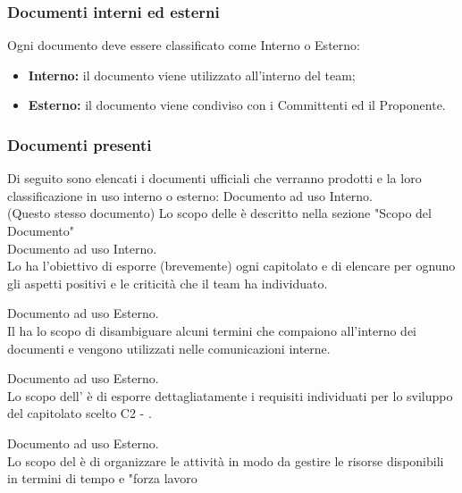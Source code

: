     \subsubsection{Documenti interni ed esterni}
      Ogni documento deve essere classificato come Interno o Esterno:
      \begin{itemize}
        \item \textbf{Interno:} il documento viene utilizzato all'interno del team;
        \item \textbf{Esterno:} il documento viene condiviso con i Committenti ed il Proponente.
      \end{itemize}

    \subsubsection{Documenti presenti}
      Di seguito sono elencati i documenti ufficiali che verranno prodotti e la loro classificazione in uso interno o esterno:
      \subsubsubsection{\NdP{}}
        Documento ad uso Interno.\\
        (Questo stesso documento) Lo scopo delle \textit{\NdP{}} è descritto nella sezione  "Scopo del Documento"\\

      \subsubsubsection{\SdF{}}
        Documento ad uso Interno.\\
        Lo \textit{\SdF{}} ha l'obiettivo di esporre (brevemente) ogni capitolato e di elencare per ognuno gli aspetti positivi e le criticità che il team ha individuato.

      \subsubsubsection{\Glossario{}}
        Documento ad uso Esterno.\\
       	Il \Glossario{}  ha lo scopo di disambiguare alcuni termini che compaiono all'interno dei documenti e vengono utilizzati nelle comunicazioni interne.

      \subsubsubsection{\AdR{}}
        Documento ad uso Esterno.\\
        Lo  scopo  dell'\textit{\AdR{}} è di esporre dettagliatamente i requisiti individuati per lo sviluppo del capitolato scelto C2 - \NomeProgetto{}.

      \subsubsubsection{\PdP{}}
        Documento ad uso Esterno.\\
        Lo scopo del \textit{\PdP{}} è di organizzare le attività in modo da gestire le risorse disponibili in termini di tempo e "forza lavoro

